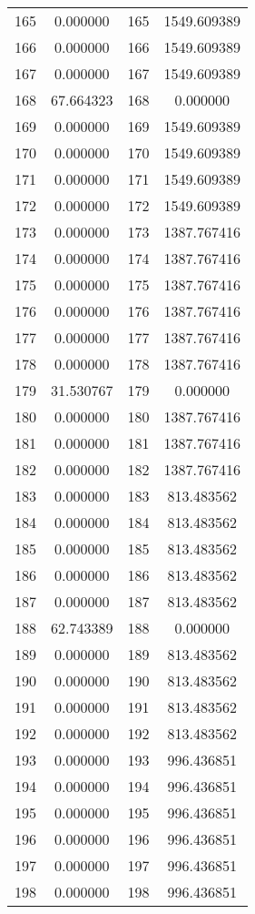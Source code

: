 \documentclass[12pt]{article}
\begin{document}
\begin{longtable}{@{}cccc@{}}
165 & 0.000000 & 165 & 1549.609389 \\
166 & 0.000000 & 166 & 1549.609389 \\
167 & 0.000000 & 167 & 1549.609389 \\
168 & 67.664323 & 168 & 0.000000 \\
169 & 0.000000 & 169 & 1549.609389 \\
170 & 0.000000 & 170 & 1549.609389 \\
171 & 0.000000 & 171 & 1549.609389 \\
172 & 0.000000 & 172 & 1549.609389 \\
173 & 0.000000 & 173 & 1387.767416 \\
174 & 0.000000 & 174 & 1387.767416 \\
175 & 0.000000 & 175 & 1387.767416 \\
176 & 0.000000 & 176 & 1387.767416 \\
177 & 0.000000 & 177 & 1387.767416 \\
178 & 0.000000 & 178 & 1387.767416 \\
179 & 31.530767 & 179 & 0.000000 \\
180 & 0.000000 & 180 & 1387.767416 \\
181 & 0.000000 & 181 & 1387.767416 \\
182 & 0.000000 & 182 & 1387.767416 \\
183 & 0.000000 & 183 & 813.483562 \\
184 & 0.000000 & 184 & 813.483562 \\
185 & 0.000000 & 185 & 813.483562 \\
186 & 0.000000 & 186 & 813.483562 \\
187 & 0.000000 & 187 & 813.483562 \\
188 & 62.743389 & 188 & 0.000000 \\
189 & 0.000000 & 189 & 813.483562 \\
190 & 0.000000 & 190 & 813.483562 \\
191 & 0.000000 & 191 & 813.483562 \\
192 & 0.000000 & 192 & 813.483562 \\
193 & 0.000000 & 193 & 996.436851 \\
194 & 0.000000 & 194 & 996.436851 \\
195 & 0.000000 & 195 & 996.436851 \\
196 & 0.000000 & 196 & 996.436851 \\
197 & 0.000000 & 197 & 996.436851 \\
198 & 0.000000 & 198 & 996.436851 \\

\end{longtable}
\end{document}
